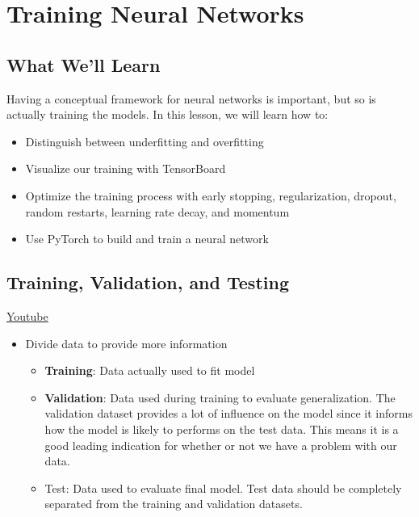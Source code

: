 \chapter{Training Neural Networks}

\section{What We'll Learn}

Having a conceptual framework for neural networks is important, but so is actually training the models. In this lesson, we will learn how to:

\begin{itemize}
    \item Distinguish between underfitting and overfitting
    \item Visualize our training with TensorBoard
    \item Optimize the training process with early stopping, regularization, dropout, random restarts, learning rate decay, and momentum
    \item Use PyTorch to build and train a neural network
\end{itemize}

\section{Training, Validation, and Testing}
\href{https://www.youtube.com/watch?v=HWt6gu5f3Q4&ab_channel=Udacity}{Youtube}\newline

\begin{itemize}
    \item Divide data to provide more information
    \begin{itemize}
        \item \textbf{Training}: Data actually used to fit model
        \item \textbf{Validation}: Data used during training to evaluate generalization. The validation dataset provides a lot of influence on the model since it informs how the model is likely to performs on the test data. This means it is a good leading indication for whether or not we have a problem with our data.
        \item Test: Data used to evaluate final model. Test data should be completely separated from the training and validation datasets. 
    \end{itemize}
\end{itemize}

